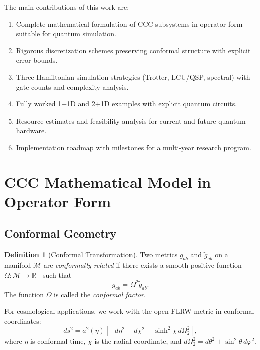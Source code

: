 \documentclass[11pt,a4paper]{article}
\newcommand{\conf}{\Omega}
\theoremstyle{plain}
\theoremstyle{definition}
\newtheorem{definition}[theorem]{Definition}
\theoremstyle{remark}
\begin{document}
The main contributions of this work are:
\begin{enumerate}
    \item Complete mathematical formulation of CCC subsystems in operator form suitable for quantum simulation.
    \item Rigorous discretization schemes preserving conformal structure with explicit error bounds.
    \item Three Hamiltonian simulation strategies (Trotter, LCU/QSP, spectral) with gate counts and complexity analysis.
    \item Fully worked 1+1D and 2+1D examples with explicit quantum circuits.
    \item Resource estimates and feasibility analysis for current and future quantum hardware.
    \item Implementation roadmap with milestones for a multi-year research program.
\end{enumerate}

\section{CCC Mathematical Model in Operator Form}\label{sec:ccc_model}

\subsection{Conformal Geometry}\label{subsec:conformal_geometry}

\begin{definition}[Conformal Transformation]
Two metrics $g_{ab}$ and $\tilde{g}_{ab}$ on a manifold $\mathcal{M}$ are \emph{conformally related} if there exists a smooth positive function $\conf: \mathcal{M} \to \mathbb{R}^+$ such that
\begin{equation}\label{eq:conformal_metric}
    g_{ab} = \conf^2 \tilde{g}_{ab}.
\end{equation}
The function $\conf$ is called the \emph{conformal factor}.
\end{definition}

For cosmological applications, we work with the open FLRW metric in conformal coordinates:
\begin{equation}\label{eq:flrw_conformal}
    ds^2 = a^2(\eta)\left[-d\eta^2 + d\chi^2 + \sinh^2\chi\, d\Omega_2^2\right],
\end{equation}
where $\eta$ is conformal time, $\chi$ is the radial coordinate, and $d\Omega_2^2 = d\theta^2 + \sin^2\theta\, d\varphi^2$.
\end{document}
